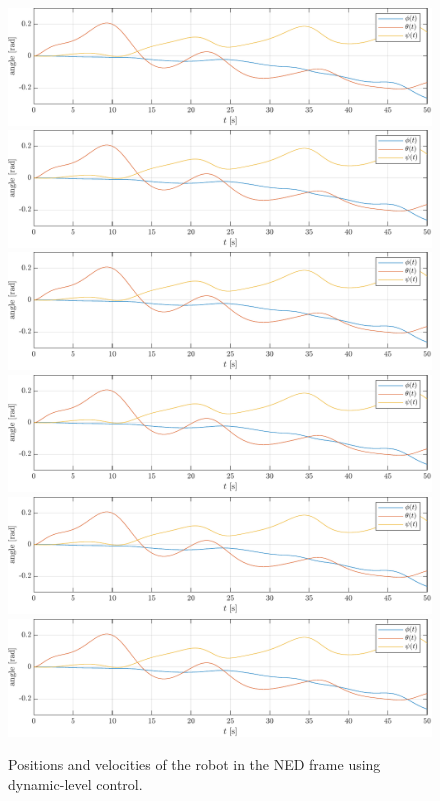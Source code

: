 \begin{figure}[h!]
    \centering
    \includegraphics[page=1,width=\linewidth]{assets/results/dynamic/plot.pdf}
    \includegraphics[page=2,width=\linewidth]{assets/results/dynamic/plot.pdf}
    \includegraphics[page=3,width=\linewidth]{assets/results/dynamic/plot.pdf}
    \includegraphics[page=6,width=\linewidth]{assets/results/dynamic/plot.pdf}
    \includegraphics[page=4,width=\linewidth]{assets/results/dynamic/plot.pdf}
    \includegraphics[page=5,width=\linewidth]{assets/results/dynamic/plot.pdf}
    \caption{Positions and velocities of the robot in the NED frame using dynamic-level control.}
\end{figure}

